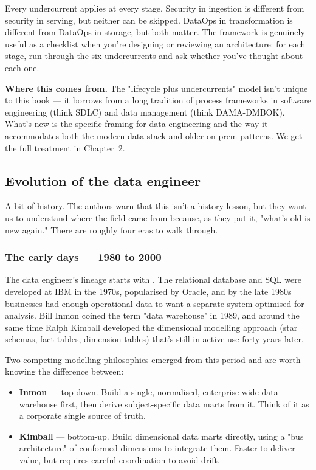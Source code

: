 Every undercurrent applies at every stage. Security in ingestion is different from security in serving, but neither can be skipped. DataOps in transformation is different from DataOps in storage, but both matter. The framework is genuinely useful as a checklist when you're designing or reviewing an architecture: for each stage, run through the six undercurrents and ask whether you've thought about each one.

\begin{notebox}
\textbf{Where this comes from.} The "lifecycle plus undercurrents" model isn't unique to this book — it borrows from a long tradition of process frameworks in software engineering (think SDLC) and data management (think DAMA-DMBOK). What's new is the specific framing for data engineering and the way it accommodates both the modern data stack and older on-prem patterns. We get the full treatment in Chapter~2.
\end{notebox}

\subsection{Evolution of the data engineer}

A bit of history. The authors warn that this isn't a history lesson, but they want us to understand where the field came from because, as they put it, "what's old is new again." There are roughly four eras to walk through.

\subsubsection{The early days — 1980 to 2000}

The data engineer's lineage starts with . The relational database and SQL were developed at IBM in the 1970s, popularised by Oracle, and by the late 1980s businesses had enough operational data to want a separate system optimised for analysis. Bill Inmon coined the term "data warehouse" in 1989, and around the same time Ralph Kimball developed the dimensional modelling approach (star schemas, fact tables, dimension tables) that's still in active use forty years later.

Two competing modelling philosophies emerged from this period and are worth knowing the difference between:

\begin{itemize}[leftmargin=*]
  \item \textbf{Inmon} — top-down. Build a single, normalised, enterprise-wide data warehouse first, then derive subject-specific data marts from it. Think of it as a corporate single source of truth.
  \item \textbf{Kimball} — bottom-up. Build dimensional data marts directly, using a "bus architecture" of conformed dimensions to integrate them. Faster to deliver value, but requires careful coordination to avoid drift.
\end{itemize}

